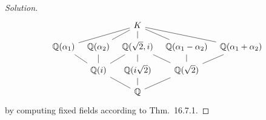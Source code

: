 \documentclass[12pt]{article}
\theoremstyle{remark}
\begin{document}
\begin{proof}[Solution]
\begin{equation*}
    \begin{tikzcd}[column sep=tiny,row sep=small]
      {}& & K\arrow[dash]{dll}\arrow[dash]{dl}\arrow[dash]{d}\arrow[dash]{dr}\arrow[dash]{drr}\\
      \mathbb{Q}(\alpha_1) & \mathbb{Q}(\alpha_2) & \mathbb{Q}(\sqrt{2},i) & \mathbb{Q}(\alpha_1-\alpha_2) & \mathbb{Q}(\alpha_1+\alpha_2)\\
      & \mathbb{Q}(i)\ar[dash]{ul}\ar[dash]{u}\ar[dash]{ur} & \mathbb{Q}(i\sqrt{2})\ar[dash]{u} & \mathbb{Q}(\sqrt{2})\ar[dash]{ul}\ar[dash]{u}\ar[dash]{ur}\\
      & & \mathbb{Q}\ar[dash]{ul}\ar[dash]{u}\ar[dash]{ur}
    \end{tikzcd}
  \end{equation*}
  by computing fixed fields according to Thm.~16.7.1.
\end{proof}
\end{document}
